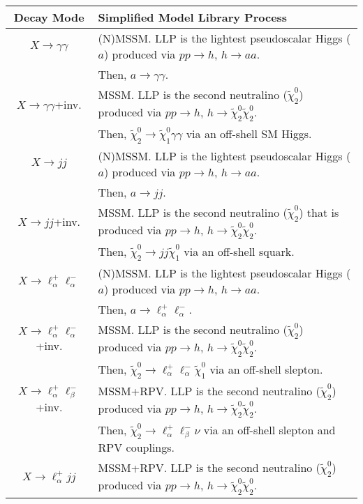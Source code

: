 \begin{table}
\begin{center}
\begin{tabular}{ |c|l|} 
 \hline
Decay Mode & Simplified Model Library Process \\
\hline\hline
$X\rightarrow \gamma\gamma$ & (N)MSSM. LLP is the lightest pseudoscalar Higgs ($a$)   produced via $pp\rightarrow h$, $h\rightarrow aa$.    \\
&  Then, $a\rightarrow\gamma\gamma$. \\
\hline
$X\rightarrow \gamma\gamma$+inv. & MSSM. LLP is the second neutralino  ($\tilde\chi_2^0$)   produced via $pp\rightarrow h$, $h\rightarrow \tilde\chi_2^0\tilde\chi_2^0$.    \\
&  Then,  $\tilde\chi_2^0\rightarrow\tilde\chi_1^0\gamma\gamma$ via an off-shell SM Higgs. \\
\hline
$X\rightarrow jj$ & (N)MSSM. LLP is the lightest pseudoscalar Higgs ($a$)   produced via $pp\rightarrow h$, $h\rightarrow aa$.    \\
&  Then, $a\rightarrow jj$. \\
\hline
$X\rightarrow jj$+inv.& MSSM. LLP is the second neutralino ($\tilde\chi_2^0$) that is produced via $pp\rightarrow h $, $h\rightarrow \tilde\chi_2^0\tilde\chi_2^0$.   \\
&  Then, $\tilde\chi_2^0\rightarrow jj\tilde\chi_1^0$  via an  off-shell  squark.\\
\hline
$X\rightarrow \ell_\alpha^+\ell_\alpha^-$ & (N)MSSM. LLP is the lightest pseudoscalar Higgs ($a$)   produced via $pp\rightarrow h$, $h\rightarrow aa$.    \\
&  Then, $a\rightarrow\ell_\alpha^+\ell_\alpha^-$. \\
\hline
$X\rightarrow \ell_\alpha^+\ell_\alpha^-$+inv. & MSSM.  LLP is the second neutralino  ($\tilde\chi_2^0$)   produced via $pp\rightarrow h$, $h\rightarrow \tilde\chi_2^0\tilde\chi_2^0$.   \\
&  Then, $\tilde\chi_2^0\rightarrow\ell_\alpha^+\ell_\alpha^-\tilde\chi^0_1$ via  an off-shell slepton.\\
\hline
$X\rightarrow \ell_\alpha^+\ell_\beta^-$+inv. & MSSM+RPV.  LLP is the second neutralino ($\tilde\chi_2^0$)  produced via $pp\rightarrow h$, $h\rightarrow \tilde\chi_2^0\tilde\chi_2^0$.   \\
&  Then, $\tilde\chi_2^0\rightarrow\ell_\alpha^+\ell_\beta^-\nu$ via  an off-shell slepton and RPV couplings.\\
\hline
$X\rightarrow \ell_\alpha^+jj$ & MSSM+RPV.  LLP is the second neutralino ($\tilde\chi_2^0$)  produced via $pp\rightarrow h$, $h\rightarrow \tilde\chi_2^0\tilde\chi_2^0$.   \\

\end{tabular}
\end{center}
\end{table}
